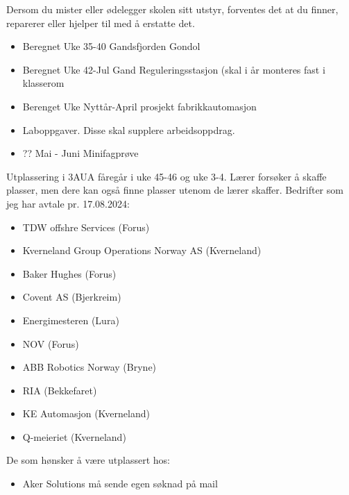 \documentclass[12pt,a4paper]{article}
\begin{document}
%

\noindent
{} Dersom du mister eller ødelegger skolen sitt utstyr, forventes det at du finner, reparerer eller hjelper til med å erstatte det. 
\vskip 10pt
\vfil
\noindent
{} 
\begin{itemize}
	\item Beregnet Uke 35-40 Gandsfjorden Gondol
	\item Beregnet Uke 42-Jul Gand Reguleringsstasjon (skal i år monteres fast i klasserom
	\item Berenget Uke Nyttår-April prosjekt fabrikkautomasjon
	\item Laboppgaver. Disse skal supplere arbeidsoppdrag. 
	\item ?? Mai - Juni Minifagprøve
\end{itemize}
\vskip 10pt
\vfil
\noindent
{} Utplassering i 3AUA fåregår i uke 45-46 og uke 3-4. Lærer forsøker å skaffe plasser, men dere kan også finne plasser utenom de lærer skaffer. 
\vskip 1cm
Bedrifter som jeg har avtale pr. 17.08.2024:
\begin{itemize}
	\item TDW offshre Services (Forus)
	\item Kverneland Group Operations Norway AS (Kverneland)
	\item Baker Hughes (Forus)
	\item Covent AS (Bjerkreim)
	\item Energimesteren (Lura)
	\item NOV (Forus)
	\item ABB Robotics Norway (Bryne)
	\item RIA (Bekkefaret)
	\item KE Automasjon (Kverneland)
	\item Q-meieriet (Kverneland)
\end{itemize}
De som hønsker å være utplassert hos:
\begin {itemize}
	\item Aker Solutions må sende egen søknad på mail
\end {itemize}
\vskip 10pt
\vfil
\end{document}
